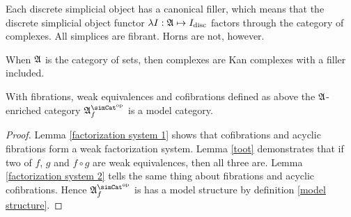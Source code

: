 \documentclass[csh.tex]{subfiles}
\begin{document}
\begin{example} Each discrete simplicial object has a canonical filler, which means that the discrete simplicial object functor $\lambda I:\mathfrak A \mapsto{I_{\rm disc}}$ factors through the category of complexes. All simplices are fibrant. Horns are not, however.
\end{example}

\begin{example} When $\mathfrak A$ is the category of sets, then complexes are Kan complexes with a filler included. \end{example}

\begin{theorem}
With fibrations, weak equivalences and cofibrations defined as above the $\mathfrak A$-enriched category $\ambient\s\f$ is a model category.
\label{model category}
\end{theorem}

\begin{proof}
Lemma \ref{factorization system 1} shows that cofibrations and acyclic fibrations form a weak factorization system. Lemma \ref{toot} demonstrates that if two of $f$, $g$ and $f\circ g$ are weak equivalences, then all three are. Lemma \ref{factorization system 2} tells the same thing about fibrations and acyclic cofibrations. Hence $\ambient\s\f$ is has a model structure by definition \ref{model structure}.
\end{proof}
\end{document}
